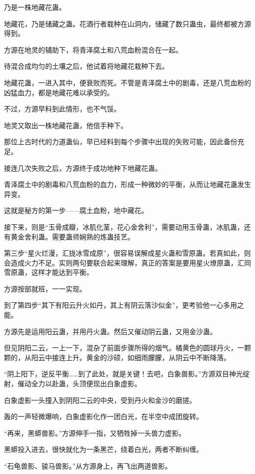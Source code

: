 \begin{this_body}
乃是一株地藏花蛊。

地藏花，乃是储藏之蛊。花酒行者栽种在山洞内，储藏了数只蛊虫，最终都被方源得到。

方源在地灵的辅助下，将青泽腐土和八荒血粉混合在一起。

待混合成均匀的土壤之后，他试着将地藏花栽种下去。

地藏花蛊，一进入其中，便衰败而死。不管是青泽腐土中的剧毒，还是八荒血粉的凶猛血力，都是地藏花难以承受的。

不过，方源早料到此情形，也不气馁。

地灵又取出一株地藏花蛊，他信手种下。

那位上古时代的力道蛊仙，早已经料到每个步骤中出现的失败可能，因此备份充足。

接连几次失败之后，方源终于成功地种下地藏花蛊。

青泽腐土中的剧毒和八荒血粉的血力，形成一种微妙的平衡，从而让地藏花蛊发生异变。

这就是秘方的第一步——腐土血粉，地中藏花。

接下来，则是“玉骨成瓣，冰肌化茎，花心金舍利”，需要动用玉骨蛊，冰肌蛊，还有黄金舍利蛊。需要蛊师娴熟的炼蛊技艺。

第三步“星火烂漫，汇拢冰雪成原”，很容易误解成星火蛊和雪原蛊。若真如此，则会造成火力不足。实则两句要联合起来理解，真正的答案是要用星火燎原蛊，汇同雪原蛊，这样才能达到平衡。

方源按部就班，一一实现。

到了第四步“其下有阳云升火如丹，其上有阴云落沙似金”，更考验他一心多用之能。

方源先是运用阳云蛊，并用丹火蛊。然后又催动阴云蛊，又用金沙蛊。

但见阴阳二云，一上一下，混杂了前面步骤所得的烟气。橘黄色的圆球丹火，一颗颗的，从阳云中接连上升。黄金的沙硕，如细雨朦朦，从阴云中不断降落。

“阴上阳下，逆反平衡……到了此处，就是关键！去吧，白象兽影。”方源双目神光绽射，催动全力以赴蛊，头顶便现出白象虚影。

白象虚影一头撞入到阴阳二云的中央，受到丹火和金沙的磨搓。

轰的一声轻微爆响，白象虚影化作一团白光，在半空中成团旋转。

“再来，黑蟒兽影。”方源伸手一指，又牺牲掉一头兽力虚影。

黑蟒投入进去，很快就化为一条黑芒，绕着白光，两者不断纠缠。

“石龟兽影、骏马兽影。”从方源身上，再飞出两道兽影。


\end{this_body}
